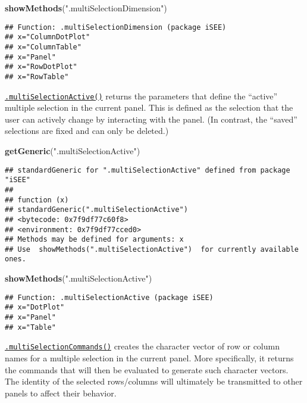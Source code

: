\documentclass[
]{book}
\newenvironment{Shaded}{\begin{snugshade}}{\end{snugshade}}
\newcommand{\KeywordTok}[1]{\textcolor[rgb]{0.13,0.29,0.53}{\textbf{#1}}}
\newcommand{\NormalTok}[1]{#1}
\newcommand{\StringTok}[1]{\textcolor[rgb]{0.31,0.60,0.02}{#1}}
\begin{document}
\begin{Shaded}
\begin{Highlighting}[]
\KeywordTok{showMethods}\NormalTok{(}\StringTok{".multiSelectionDimension"}\NormalTok{)}
\end{Highlighting}
\end{Shaded}

\begin{verbatim}
## Function: .multiSelectionDimension (package iSEE)
## x="ColumnDotPlot"
## x="ColumnTable"
## x="Panel"
## x="RowDotPlot"
## x="RowTable"
\end{verbatim}

\href{https://isee.github.io/iSEE/reference/multi-select-generics.html}{\texttt{.multiSelectionActive()}} returns the parameters that define the ``active'' multiple selection in the current panel.
This is defined as the selection that the user can actively change by interacting with the panel.
(In contrast, the ``saved'' selections are fixed and can only be deleted.)

\begin{Shaded}
\begin{Highlighting}[]
\KeywordTok{getGeneric}\NormalTok{(}\StringTok{".multiSelectionActive"}\NormalTok{)}
\end{Highlighting}
\end{Shaded}

\begin{verbatim}
## standardGeneric for ".multiSelectionActive" defined from package "iSEE"
## 
## function (x) 
## standardGeneric(".multiSelectionActive")
## <bytecode: 0x7f9df77c60f8>
## <environment: 0x7f9df77cced0>
## Methods may be defined for arguments: x
## Use  showMethods(".multiSelectionActive")  for currently available ones.
\end{verbatim}

\begin{Shaded}
\begin{Highlighting}[]
\KeywordTok{showMethods}\NormalTok{(}\StringTok{".multiSelectionActive"}\NormalTok{)}
\end{Highlighting}
\end{Shaded}

\begin{verbatim}
## Function: .multiSelectionActive (package iSEE)
## x="DotPlot"
## x="Panel"
## x="Table"
\end{verbatim}

\href{https://isee.github.io/iSEE/reference/multi-select-generics.html}{\texttt{.multiSelectionCommands()}} creates the character vector of row or column names for a multiple selection in the current panel.
More specifically, it returns the commands that will then be evaluated to generate such character vectors.
The identity of the selected rows/columns will ultimately be transmitted to other panels to affect their behavior.
\end{document}
